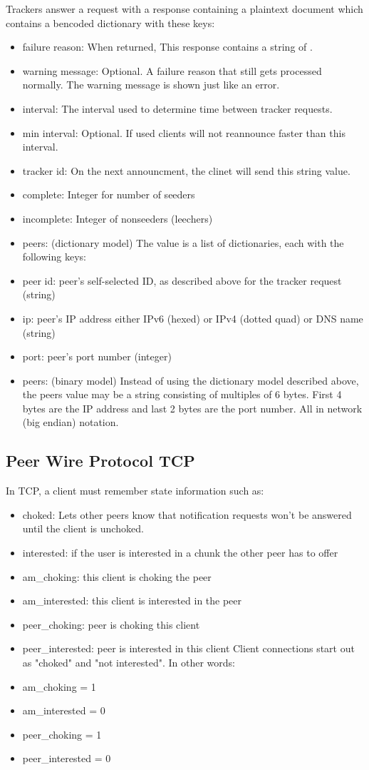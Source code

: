 \documentclass[letter]{scrartcl}
\begin{document}
Trackers answer a request with a response containing a plaintext document which contains a bencoded dictionary with these keys:
\begin{itemize}
\item failure reason: When returned, This response contains a string of .
\item warning message: Optional. A failure reason that still gets processed normally. The warning message is shown just like an error.
\item interval: The interval used to determine time between tracker requests.
\item min interval: Optional. If used clients will not reannounce faster than this interval.
\item tracker id: On the next announcment, the clinet will send this string value.
\item complete: Integer for number of seeders
\item incomplete: Integer of nonseeders (leechers)
\item peers: (dictionary model) The value is a list of dictionaries, each with the following keys:
\item peer id: peer's self-selected ID, as described above for the tracker request (string)
\item ip: peer's IP address either IPv6 (hexed) or IPv4 (dotted quad) or DNS name (string)
\item port: peer's port number (integer)
\item peers: (binary model) Instead of using the dictionary model described above, the peers value may be a string consisting of multiples of 6 bytes. First 4 bytes are the IP address and last 2 bytes are the port number. All in network (big endian) notation.
\end{itemize}
\subsection{Peer Wire Protocol TCP}

In TCP, a client must remember state information such as:

\begin{itemize}
\item choked: Lets other peers know that notification requests won't be answered until the client is unchoked.
\item interested: if the user is interested in a chunk the other peer has to offer
\item am\_choking: this client is choking the peer
\item am\_interested: this client is interested in the peer
\item peer\_choking: peer is choking this client
\item peer\_interested: peer is interested in this client
Client connections start out as "choked" and "not interested". In other words:
\item am\_choking = 1
\item am\_interested = 0
\item peer\_choking = 1
\item peer\_interested = 0
\end{itemize}
\end{document}
